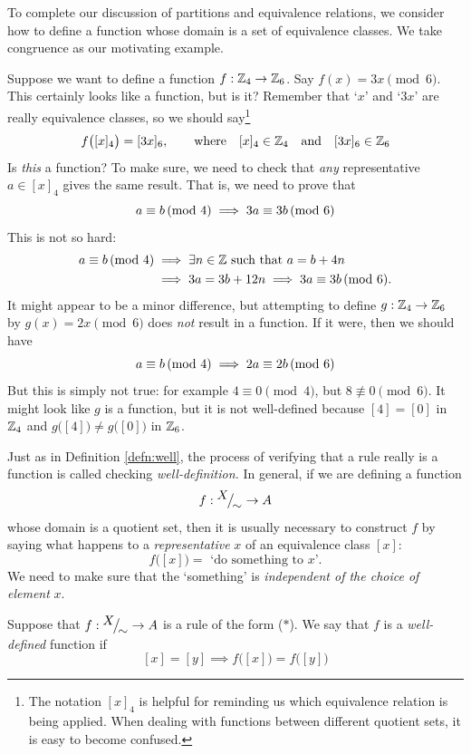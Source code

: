 
To complete our discussion of partitions and equivalence relations, we consider how to define a function whose domain is a set of equivalence classes. We take congruence as our motivating example.\par

Suppose we want to define a function $f:\mathbb{Z}_4\to\mathbb{Z}_6$. Say $f(x)=3x\pmod 6$. This certainly looks like a function, but is it? Remember that `$x$' and `$3x$' are really equivalence classes, so we should say\footnote{The notation $[x]_4$ is helpful for reminding us which equivalence relation is being applied. When dealing with functions between different quotient sets, it is easy to become confused.}
\[
	f\bigl([x]_4\bigr)=[3x]_6,\qquad\text{where}\quad [x]_4\in\mathbb{Z}_4\quad\text{and}\quad [3x]_6\in\mathbb{Z}_6
\]
Is \emph{this} a function? To make sure, we need to check that \emph{any} representative $a\in[x]_4$ gives the same result. That is, we need to prove that
\[
	a\equiv b\negthickspace\pmod{4}\implies 3a\equiv 3b\negthickspace\pmod{6}
\]
This is not so hard:
\begin{align*}
	a\equiv b\negthickspace\pmod{4}&\implies \exists n\in\mathbb{Z}\text{ such that }a=b+4n\\
	&\implies 3a=3b+12n\implies 3a\equiv 3b\negthickspace\pmod{6}.
\end{align*}
It might appear to be a minor difference, but attempting to define $g:\mathbb{Z}_4\to\mathbb{Z}_6$ by $g(x)=2x\pmod 6$ does \emph{not} result in a function. If it were, then we should have
\[
	a\equiv b\negthickspace\pmod{4}\implies 2a\equiv 2b\negthickspace\pmod{6}
\]
But this is simply not true: for example $4\equiv 0\pmod 4$, but $8\not\equiv 0\pmod 6$. It might look like $g$ is a function, but it is not well-defined because $[4]=[0]$ in $\mathbb{Z}_4$ and $g\bigl([4]\bigr)\neq g\bigl([0]\bigr)$ in $\mathbb{Z}_6$.\par

Just as in Definition \ref{defn:well}, the process of verifying that a rule really is a function is called checking \emph{well-definition.} In general, if we are defining a function
\[
	f:{}^{\textstyle {X}}\!\big/_{\textstyle \!{\sim}}\to A
\]
whose domain is a quotient set, then it is usually necessary to construct $f$ by saying what happens to a \emph{representative} $x$ of an equivalence class $[x]$:
\[
	f\bigl([x]\bigr)=\text{ `do something to $x$'.}\tag{$\ast$}
\]
We need to make sure that the `something' is \emph{independent of the choice of element} $x$.

\begin{defn}{}{}
	Suppose that $f:{}^{\textstyle {X}}\!\big/_{\textstyle \!{\sim}}\to A$ is a rule of the form ($\ast$). We say that $f$ is a \emph{well-defined} function if
	\[
		[x]=[y]\implies f\bigl([x]\bigr)=f\bigl([y]\bigr)
	\]
\end{defn}

